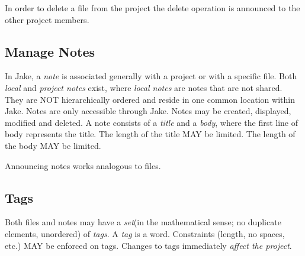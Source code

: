 In order to delete a file from the project the delete operation is announced to the other project members.

\subsection{Manage Notes}
In Jake, a \emph{note} is associated generally with a project or with a specific file. Both \emph{local} and \emph{project notes} exist, where \emph{local notes} are notes that are not shared. They are NOT hierarchically ordered and reside in one common location within Jake. Notes are only accessible through Jake. Notes may be created, displayed, modified and deleted. 
A note consists of a \emph{title} and a \emph{body}, where the first line of body represents the title. The length of the title MAY be limited. The length of the body MAY be limited. 

Announcing notes works analogous to files.

\subsection{Tags}
Both files and notes may have a \emph{set}(in the mathematical sense; no duplicate elements, unordered) of \emph{tags}. A \emph{tag} is a 
word. Constraints (length, no spaces, etc.) MAY be enforced on tags. Changes to tags immediately \emph{affect the project}.

